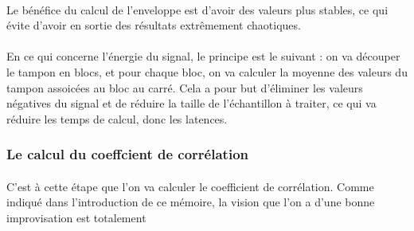 \paragraph{}
Le bénéfice du calcul de l'enveloppe est d'avoir des valeurs plus stables, ce qui évite d'avoir en sortie des résultats extrêmement chaotiques.
\paragraph{}
En ce qui concerne l'énergie du signal, le principe est le suivant : on va découper le tampon en blocs, et pour chaque bloc, on va calculer la moyenne des valeurs du tampon assoicées au bloc au carré. Cela a pour but d'éliminer les valeurs négatives du signal et de réduire la taille de l'échantillon à traiter,
ce qui va réduire les temps de calcul, donc les latences.
\subsubsection{Le calcul du coeffcient de corrélation}
\paragraph{}
C'est à cette étape que l'on va calculer le coefficient de corrélation. Comme indiqué dans l'introduction de ce mémoire, la vision que l'on a d'une bonne improvisation est totalement 

